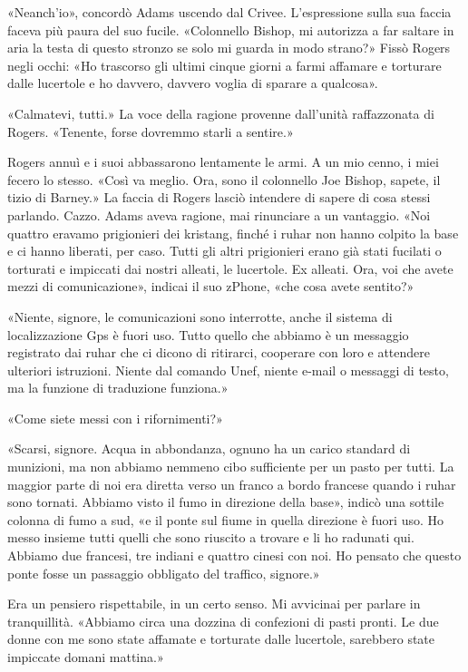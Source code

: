 «Neanch'io», concordò Adams uscendo dal Crivee. L'espressione sulla sua
faccia faceva più paura del suo fucile. «Colonnello Bishop, mi autorizza
a far saltare in aria la testa di questo stronzo se solo mi guarda in
modo strano?» Fissò Rogers negli occhi: «Ho trascorso gli ultimi cinque
giorni a farmi affamare e torturare dalle lucertole e ho davvero,
davvero voglia di sparare a qualcosa».

«Calmatevi, tutti.» La voce della ragione provenne dall'unità
raffazzonata di Rogers. «Tenente, forse dovremmo starli a sentire.»

Rogers annuì e i suoi abbassarono lentamente le armi. A un mio cenno, i
miei fecero lo stesso. «Così va meglio. Ora, sono il colonnello Joe
Bishop, sapete, il tizio di Barney.» La faccia di Rogers lasciò
intendere di sapere di cosa stessi parlando. Cazzo. Adams aveva ragione,
mai rinunciare a un vantaggio. «Noi quattro eravamo prigionieri dei
kristang, finché i ruhar non hanno colpito la base e ci hanno liberati,
per caso. Tutti gli altri prigionieri erano già stati fucilati o
torturati e impiccati dai nostri alleati, le lucertole. Ex alleati. Ora,
voi che avete mezzi di comunicazione», indicai il suo zPhone, «che cosa
avete sentito?»

«Niente, signore, le comunicazioni sono interrotte, anche il sistema di
localizzazione Gps è fuori uso. Tutto quello che abbiamo è un messaggio
registrato dai ruhar che ci dicono di ritirarci, cooperare con loro e
attendere ulteriori istruzioni. Niente dal comando Unef, niente e-mail o
messaggi di testo, ma la funzione di traduzione funziona.»

«Come siete messi con i rifornimenti?»

«Scarsi, signore. Acqua in abbondanza, ognuno ha un carico standard di
munizioni, ma non abbiamo nemmeno cibo sufficiente per un pasto per
tutti. La maggior parte di noi era diretta verso un franco a bordo
francese quando i ruhar sono tornati. Abbiamo visto il fumo in direzione
della base», indicò una sottile colonna di fumo a sud, «e il ponte sul
fiume in quella direzione è fuori uso. Ho messo insieme tutti quelli che
sono riuscito a trovare e li ho radunati qui. Abbiamo due francesi, tre
indiani e quattro cinesi con noi. Ho pensato che questo ponte fosse un
passaggio obbligato del traffico, signore.»

Era un pensiero rispettabile, in un certo senso. Mi avvicinai per
parlare in tranquillità. «Abbiamo circa una dozzina di confezioni di
pasti pronti. Le due donne con me sono state affamate e torturate dalle
lucertole, sarebbero state impiccate domani mattina.»

